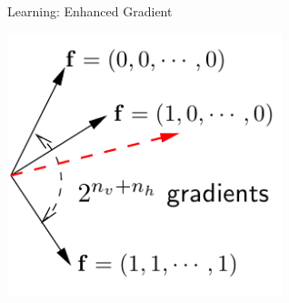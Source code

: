 \documentclass{beamer}
\begin{document}
\begin{frame}{Learning: Enhanced Gradient}
    \begin{minipage}{0.35\textwidth}
        \begin{minipage}{\columnwidth}
            \begin{center}
                \includegraphics[width=0.6\textwidth]{enhgrad.png}
            \end{center}
        \end{minipage}

        \vspace{2mm}


\end{minipage}
\end{frame}
\end{document}
